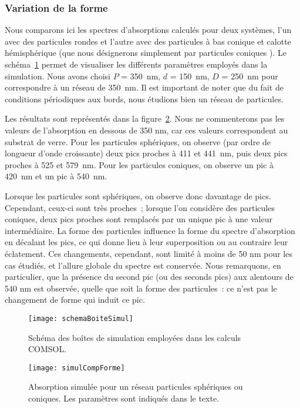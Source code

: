 	\subsubsection{Variation de la forme}
Nous comparons ici les spectres d’absorptions calculés pour deux systèmes, l’un avec des particules rondes et l’autre avec des particules à bas conique et calotte hémisphérique (que nous désignerons simplement par \og particules coniques \fg). Le schéma~\ref{schemaBoiteSimul} permet de visualiser les différents paramètres employés dans la simulation. Nous avons choisi $P$ = 350~nm, $d$ = 150~nm, $D$ = 250~nm pour correspondre à un réseau de 350~nm. Il est important de noter que du fait de conditions périodiques aux bords, nous étudions bien un réseau de particules.\par 
Les résultats sont représentés dans la figure~\ref{simulCompForme}. Nous ne commenterons pas les valeurs de l’absorption en dessous de 350 nm, car ces valeurs correspondent au substrat de verre. Pour les particules sphériques, on observe (par ordre de longueur d’onde croissante) deux pics proches à 411 et 441~nm, puis deux pics proches à 525 et 579~nm. Pour les particules coniques, on observe un pic à 420~nm et un pic à 540~nm.\par 
Lorsque les particules sont sphériques, on observe donc davantage de pics. Cependant, ceux-ci sont très proches~; lorsque l’on considère des particules coniques, deux pics proches sont remplacés par un unique pic à une valeur intermédiaire. La forme des particules influence la forme du spectre d’absorption en décalant les pics, ce qui donne lieu à leur superposition ou au contraire leur éclatement. Ces changements, cependant, sont limité à moins de 50 nm pour les cas étudiés, et l'allure globale du spectre est conservée. Nous remarquons, en particulier, que la présence du second pic (ou des seconds pics) aux alentours de 540 nm est observée, quelle que soit la forme des particules~: ce n’est pas le changement de forme qui induit ce pic.\par 
\begin{figure}[!htb]
\centering
\texttt{[image: schemaBoiteSimul]}
\caption{Schéma des boîtes de simulation employées dans les calculs COMSOL.}
\label{schemaBoiteSimul}
\end{figure}
\begin{figure}[!htb]
\centering
\texttt{[image: simulCompForme]}
\caption{Absorption simulée pour un réseau particules sphériques ou coniques. Les paramètres sont indiqués dans le texte.}
\label{simulCompForme}
\end{figure}
